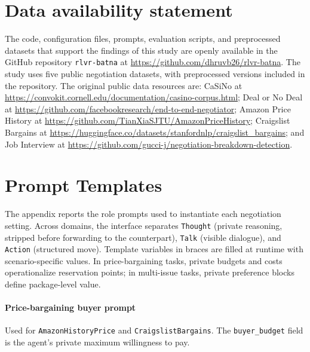 \documentclass{interact}
\theoremstyle{plain}
\theoremstyle{definition}
\theoremstyle{remark}
\begin{document}
\section*{Data availability statement}

The code, configuration files, prompts, evaluation scripts, and preprocessed datasets that support the findings of this study are openly available in the GitHub repository \texttt{rlvr-batna} at \url{https://github.com/dhruvb26/rlvr-batna}. The study uses five public negotiation datasets, with preprocessed versions included in the repository. The original public data resources are: CaSiNo at \url{https://convokit.cornell.edu/documentation/casino-corpus.html}; Deal or No Deal at \url{https://github.com/facebookresearch/end-to-end-negotiator}; Amazon Price History at \url{https://github.com/TianXiaSJTU/AmazonPriceHistory}; Craigslist Bargains at \url{https://huggingface.co/datasets/stanfordnlp/craigslist_bargains}; and Job Interview at \url{https://github.com/gucci-j/negotiation-breakdown-detection}.




\appendix

\section{Prompt Templates}\label{app:prompts}

The appendix reports the role prompts used to instantiate each negotiation setting. Across domains, the interface separates \texttt{Thought} (private reasoning, stripped before forwarding to the counterpart), \texttt{Talk} (visible dialogue), and \texttt{Action} (structured move). Template variables in braces are filled at runtime with scenario-specific values. In price-bargaining tasks, private budgets and costs operationalize reservation points; in multi-issue tasks, private preference blocks define package-level value.


\paragraph{Price-bargaining buyer prompt} Used for \texttt{AmazonHistoryPrice} and \texttt{CraigslistBargains}. The \texttt{buyer\_budget} field is the agent's private maximum willingness to pay.
\end{document}
